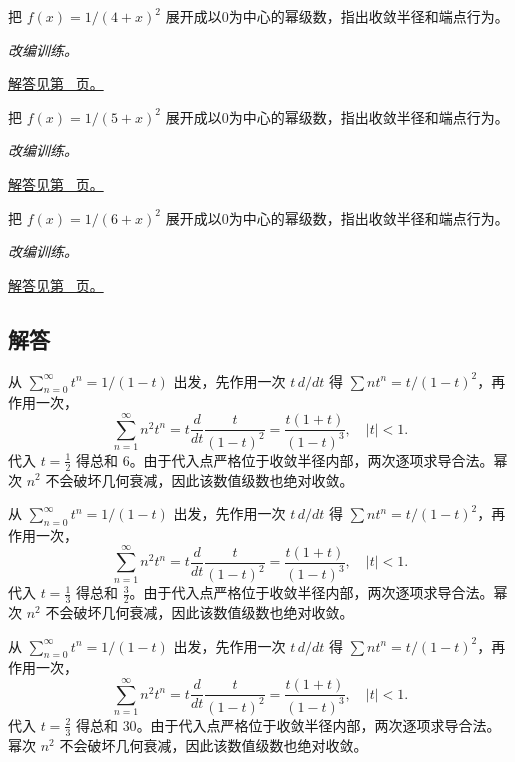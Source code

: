 \documentclass[12pt,fontset=fandol]{ctexart}
\begin{document}
\begin{example}[由几何展开求有理函数的级数]\label{ex:c27q22}
把 $f(x)=1/(4+x)^2$ 展开成以0为中心的幂级数，指出收敛半径和端点行为。
\par\textit{改编训练。}\par\hyperref[ans:c27q22]{解答见第~\pageref{ans:c27q22} 页。}
\end{example}
\begin{example}[由几何展开求有理函数的级数]\label{ex:c27q23}
把 $f(x)=1/(5+x)^2$ 展开成以0为中心的幂级数，指出收敛半径和端点行为。
\par\textit{改编训练。}\par\hyperref[ans:c27q23]{解答见第~\pageref{ans:c27q23} 页。}
\end{example}
\begin{example}[由几何展开求有理函数的级数]\label{ex:c27q24}
把 $f(x)=1/(6+x)^2$ 展开成以0为中心的幂级数，指出收敛半径和端点行为。
\par\textit{改编训练。}\par\hyperref[ans:c27q24]{解答见第~\pageref{ans:c27q24} 页。}
\end{example}
\subsection{解答}
\begin{solve}\label{ans:c27q1}
从 $\sum_{n=0}^\infty t^n=1/(1-t)$ 出发，先作用一次 $t\,d/dt$ 得 $\sum nt^n=t/(1-t)^2$，再作用一次，
\[
\sum_{n=1}^\infty n^2t^n=t\frac d{dt}\frac{t}{(1-t)^2}=\frac{t(1+t)}{(1-t)^3},\quad |t|<1.
\]
代入 $t=\frac{1}{2}$ 得总和 $6$。由于代入点严格位于收敛半径内部，两次逐项求导合法。幂次 $n^2$ 不会破坏几何衰减，因此该数值级数也绝对收敛。
\end{solve}

\begin{solve}\label{ans:c27q2}
从 $\sum_{n=0}^\infty t^n=1/(1-t)$ 出发，先作用一次 $t\,d/dt$ 得 $\sum nt^n=t/(1-t)^2$，再作用一次，
\[
\sum_{n=1}^\infty n^2t^n=t\frac d{dt}\frac{t}{(1-t)^2}=\frac{t(1+t)}{(1-t)^3},\quad |t|<1.
\]
代入 $t=\frac{1}{3}$ 得总和 $\frac{3}{2}$。由于代入点严格位于收敛半径内部，两次逐项求导合法。幂次 $n^2$ 不会破坏几何衰减，因此该数值级数也绝对收敛。
\end{solve}

\begin{solve}\label{ans:c27q3}
从 $\sum_{n=0}^\infty t^n=1/(1-t)$ 出发，先作用一次 $t\,d/dt$ 得 $\sum nt^n=t/(1-t)^2$，再作用一次，
\[
\sum_{n=1}^\infty n^2t^n=t\frac d{dt}\frac{t}{(1-t)^2}=\frac{t(1+t)}{(1-t)^3},\quad |t|<1.
\]
代入 $t=\frac{2}{3}$ 得总和 $30$。由于代入点严格位于收敛半径内部，两次逐项求导合法。幂次 $n^2$ 不会破坏几何衰减，因此该数值级数也绝对收敛。
\end{solve}
\end{document}
